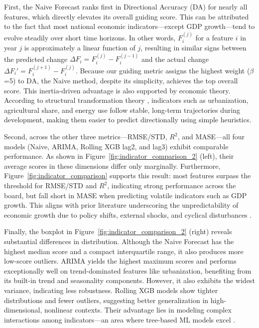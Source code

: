 \documentclass[12pt]{article}
\begin{document}
First, the Naive Forecast ranks first in Directional Accuracy (DA) for nearly all features, which directly elevates its overall guiding score. This can be attributed to the fact that most national economic indicators—except GDP growth—tend to evolve steadily over short time horizons. In other words, $F_i^{(j)}$ for a feature $i$ in year $j$ is approximately a linear function of $j$, resulting in similar signs between the predicted change $\Delta F_i = F_i^{(j)} - F_i^{(j-1)}$ and the actual change $\Delta F_i' = F_i^{(j+1)} - F_i^{(j)}$. Because our guiding metric assigns the highest weight ($\beta$=5) to DA, the Naive method, despite its simplicity, achieves the top overall score. This inertia-driven advantage is also supported by economic theory. According to structural transformation theory \cite{Kuznets1971}, indicators such as urbanization, agricultural share, and energy use follow stable, long-term trajectories during development, making them easier to predict directionally using simple heuristics.

Second, across the other three metrics—RMSE/STD, $R^2$, and MASE—all four models (Naive, ARIMA, Rolling XGB lag2, and lag3) exhibit comparable performance. As shown in Figure~\ref{fig:indicator_comparison_2} (left), their average scores in these dimensions differ only marginally. Furthermore, Figure~\ref{fig:indicator_comparison} supports this result: most features surpass the threshold for RMSE/STD and $R^2$, indicating strong performance across the board, but fall short in MASE when predicting volatile indicators such as GDP growth. This aligns with prior literature underscoring the unpredictability of economic growth due to policy shifts, external shocks, and cyclical disturbances \cite{Loungani2001}.

Finally, the boxplot in Figure~\ref{fig:indicator_comparison_2} (right) reveals substantial differences in distribution. Although the Naive Forecast has the highest median score and a compact interquartile range, it also produces more low-score outliers. ARIMA yields the highest maximum scores and performs exceptionally well on trend-dominated features like urbanization, benefiting from its built-in trend and seasonality components. However, it also exhibits the widest variance, indicating less robustness. Rolling XGB models show tighter distributions and fewer outliers, suggesting better generalization in high-dimensional, nonlinear contexts. Their advantage lies in modeling complex interactions among indicators—an area where tree-based ML models excel \cite{Athey2019ML, Mullainathan2017ML}.
\end{document}
